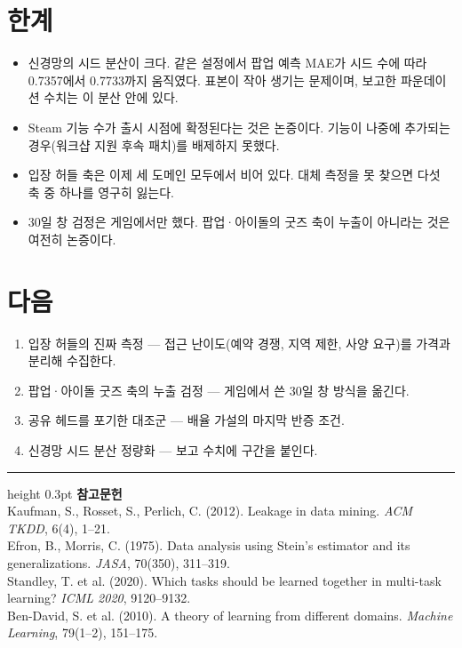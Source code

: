 \documentclass[10pt]{article}
\begin{document}
\section{한계}

\begin{itemize}[leftmargin=1.1em,itemsep=0.15em]
\item 신경망의 시드 분산이 크다. 같은 설정에서 팝업 예측 MAE가 시드 수에 따라
      0.7357에서 0.7733까지 움직였다. 표본이 작아 생기는 문제이며, 보고한
      파운데이션 수치는 이 분산 안에 있다.
\item Steam 기능 수가 출시 시점에 확정된다는 것은 논증이다. 기능이 나중에 추가되는
      경우(워크샵 지원 후속 패치)를 배제하지 못했다.
\item 입장 허들 축은 이제 세 도메인 모두에서 비어 있다. 대체 측정을 못 찾으면
      다섯 축 중 하나를 영구히 잃는다.
\item 30일 창 검정은 게임에서만 했다. 팝업·아이돌의 굿즈 축이 누출이 아니라는
      것은 여전히 논증이다.
\end{itemize}

\section{다음}

\begin{enumerate}[leftmargin=1.3em,itemsep=0.15em]
\item 입장 허들의 진짜 측정 --- 접근 난이도(예약 경쟁, 지역 제한, 사양 요구)를
      가격과 분리해 수집한다.
\item 팝업·아이돌 굿즈 축의 누출 검정 --- 게임에서 쓴 30일 창 방식을 옮긴다.
\item 공유 헤드를 포기한 대조군 --- 배율 가설의 마지막 반증 조건.
\item 신경망 시드 분산 정량화 --- 보고 수치에 구간을 붙인다.
\end{enumerate}

\vspace{0.6em}
\hrule height 0.3pt
\vspace{0.5em}
{\footnotesize
\textbf{참고문헌}\\[0.3em]
Kaufman, S., Rosset, S., Perlich, C. (2012). Leakage in data mining.
\emph{ACM TKDD}, 6(4), 1--21.\\[0.15em]
Efron, B., Morris, C. (1975). Data analysis using Stein's estimator and its
generalizations. \emph{JASA}, 70(350), 311--319.\\[0.15em]
Standley, T. et al. (2020). Which tasks should be learned together in multi-task
learning? \emph{ICML 2020}, 9120--9132.\\[0.15em]
Ben-David, S. et al. (2010). A theory of learning from different domains.
\emph{Machine Learning}, 79(1--2), 151--175.
}
\end{document}
